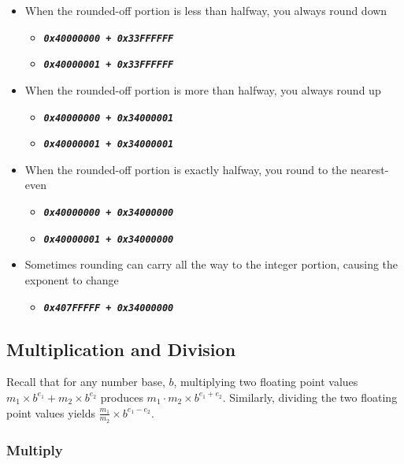     \begin{itemize}
        \item When the rounded-off portion is less than halfway, you always round down
        \begin{itemize}
            \item[] \texttt{\textbf{\textit{0x40000000 + 0x33FFFFFF}}}
            \item[] \texttt{\textbf{\textit{0x40000001 + 0x33FFFFFF}}}
        \end{itemize}
        \item When the rounded-off portion is more than halfway, you always round up
        \begin{itemize}
            \item[] \texttt{\textbf{\textit{0x40000000 + 0x34000001}}}
            \item[] \texttt{\textbf{\textit{0x40000001 + 0x34000001}}}
        \end{itemize}
        \item When the rounded-off portion is exactly halfway, you round to the nearest-even
        \begin{itemize}
            \item[] \texttt{\textbf{\textit{0x40000000 + 0x34000000}}}
            \item[] \texttt{\textbf{\textit{0x40000001 + 0x34000000}}}
        \end{itemize}
        \item Sometimes rounding can carry all the way to the integer portion, causing the exponent to change
        \begin{itemize}
            \item[] \texttt{\textbf{\textit{0x407FFFFF + 0x34000000}}}
        \end{itemize}
    \end{itemize}

    \subsection{Multiplication and Division}

    Recall that for any number base, $b$, multiplying two floating point values $m_1 \times b^{e_1} + m_2 \times b^{e_2}$ produces $m_1 \cdot m_2 \times b^{e_1 + e_2}$.
    Similarly, dividing the two floating point values yields $\frac{m_1}{m_2} \times b^{e_1 - e_2}$.

    \subsubsection{Multiply}

